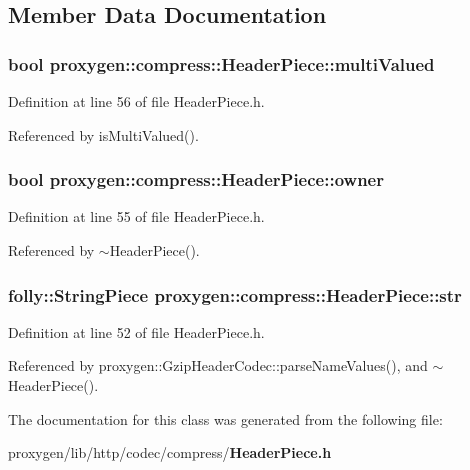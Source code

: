 \subsection{Member Data Documentation}
\subsubsection[{multi\+Valued}]{\setlength{\rightskip}{0pt plus 5cm}bool proxygen\+::compress\+::\+Header\+Piece\+::multi\+Valued\hspace{0.3cm}{\ttfamily [private]}}\label{classproxygen_1_1compress_1_1HeaderPiece_ad730012ddb65a95b3e716cd0b2bd7141}


Definition at line 56 of file Header\+Piece.\+h.



Referenced by is\+Multi\+Valued().

\subsubsection[{owner}]{\setlength{\rightskip}{0pt plus 5cm}bool proxygen\+::compress\+::\+Header\+Piece\+::owner\hspace{0.3cm}{\ttfamily [private]}}\label{classproxygen_1_1compress_1_1HeaderPiece_a8192242ab552fc1523ec96489d01f365}


Definition at line 55 of file Header\+Piece.\+h.



Referenced by $\sim$\+Header\+Piece().

\subsubsection[{str}]{\setlength{\rightskip}{0pt plus 5cm}folly\+::\+String\+Piece proxygen\+::compress\+::\+Header\+Piece\+::str}\label{classproxygen_1_1compress_1_1HeaderPiece_ae87c7ba9578f12b151a0d24a8b6e3601}


Definition at line 52 of file Header\+Piece.\+h.



Referenced by proxygen\+::\+Gzip\+Header\+Codec\+::parse\+Name\+Values(), and $\sim$\+Header\+Piece().



The documentation for this class was generated from the following file\+:\begin{DoxyCompactItemize}
\item 
proxygen/lib/http/codec/compress/{\bf Header\+Piece.\+h}\end{DoxyCompactItemize}
